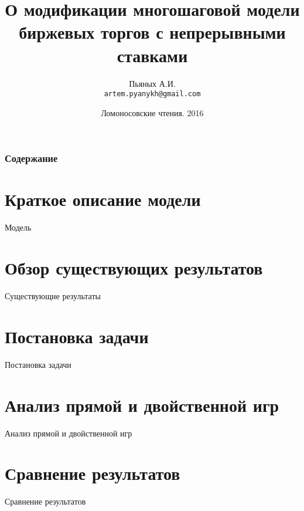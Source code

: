 \documentclass{beamer}
\title[Биржевые торги с непрерывными ставками]{%
  О модификации многошаговой модели биржевых торгов с непрерывными ставками%
}
\author{%
Пьяных А.И.\\
\texttt{artem.pyanykh@gmail.com}%
}
\institute{%
  Московский Государственный Университет \\
  Факультет вычислительной математики и кибернетики%
}
\date{Ломоносовские чтения. 2016}
\begin{document}
\begin{frame}
  \titlepage
\end{frame}

\begin{frame}
  \frametitle{Содержание}
  \tableofcontents
\end{frame}

\section[]{Краткое описание модели}

\begin{frame}
  Модель
\end{frame}

\section[]{Обзор существующих результатов}

\begin{frame}
  Существующие результаты
\end{frame}

\section[]{Постановка задачи}

\begin{frame}
  Постановка задачи
\end{frame}

\section[]{Анализ прямой и двойственной игр}

\begin{frame}
  Анализ прямой и двойственной игр
\end{frame}

\section[]{Сравнение результатов}

\begin{frame}
  Сравнение результатов
\end{frame}
\end{document}
